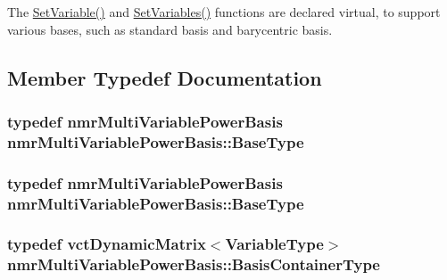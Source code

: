 The \hyperlink{classnmr_multi_variable_power_basis_a6725bd03e0272877f0737187345aab6d}{Set\-Variable()} and \hyperlink{classnmr_multi_variable_power_basis_a250029c052022602969689861c94a5c2}{Set\-Variables()} functions are declared virtual, to support various bases, such as standard basis and barycentric basis. 

\subsection{Member Typedef Documentation}
\hypertarget{classnmr_multi_variable_power_basis_aaf11c12fba7357db886d9eee2fc480b4}{
\subsubsection[{Base\-Type}]{\setlength{\rightskip}{0pt plus 5cm}typedef {\bf nmr\-Multi\-Variable\-Power\-Basis} {\bf nmr\-Multi\-Variable\-Power\-Basis\-::\-Base\-Type}}}\label{classnmr_multi_variable_power_basis_aaf11c12fba7357db886d9eee2fc480b4}
\hypertarget{classnmr_multi_variable_power_basis_aaf11c12fba7357db886d9eee2fc480b4}{
\subsubsection[{Base\-Type}]{\setlength{\rightskip}{0pt plus 5cm}typedef {\bf nmr\-Multi\-Variable\-Power\-Basis} {\bf nmr\-Multi\-Variable\-Power\-Basis\-::\-Base\-Type}}}\label{classnmr_multi_variable_power_basis_aaf11c12fba7357db886d9eee2fc480b4}
\hypertarget{classnmr_multi_variable_power_basis_ac85dc969184c15d34dd849c4cbd04180}{
\subsubsection[{Basis\-Container\-Type}]{\setlength{\rightskip}{0pt plus 5cm}typedef {\bf vct\-Dynamic\-Matrix}$<${\bf Variable\-Type}$>$ {\bf nmr\-Multi\-Variable\-Power\-Basis\-::\-Basis\-Container\-Type}\hspace{0.3cm}{\ttfamily [protected]}}}\label{classnmr_multi_variable_power_basis_ac85dc969184c15d34dd849c4cbd04180}
